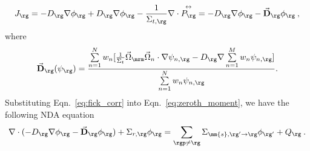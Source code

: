   \begin{equation}
  J_\rg = -D_\rg \nabla \phi_\rg + D_\rg \nabla \phi_\rg - \frac{1}{\Sigma_{t, \rg}} \nabla \cdot \overset{\text{\scriptsize$\leftrightarrow$}}{P_\rg} \\
  = -D_\rg \nabla \phi_\rg - \vec{\textbf{D}}_\rg \phi_\rg \:,
  \label{eq:fick_corr}
  \end{equation}
  where 
 \begin{equation}
  \vec{\textbf{D}}_\rg (\psi_\rg) = \frac{\sum\limits_{n=1}^N w_n [\frac{1}{\Sigma_t} \vec{\Omega}_\mrm \vec{\Omega}_n \cdot \nabla\psi_{n, \rg} - D_\rg \nabla \sum\limits_{n=1}^M w_n\psi_{n, \rg}]}{\sum\limits_{n=1}^N w_n \psi_{n, \rg}}.
  \end{equation} 
 Substituting Eqn.~\eqref{eq:fick_corr} into Eqn.~\eqref{eq:zeroth_moment}, we have the following NDA equation
  \begin{equation}
  \nabla\cdot(-D_\rg \nabla \phi_\rg - \vec{\bf D}_\rg \phi_\rg) + \Sigma_{r,\rg} \phi_\rg = \sum\limits_{\rgp\neq\rg}\Sigma_{\mm{s},\rg' \rightarrow \rg}\phi_{\rg'} + Q_\rg \:. \label{eq:NDA}
  \end{equation}

